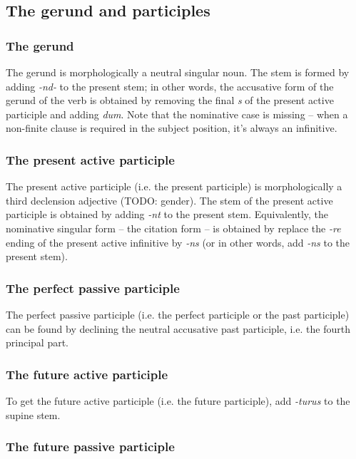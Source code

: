 \documentclass[a4paper, oneside, 12pt]{report}
\newcommand{\form}[1]{\emph{#1}}
\begin{document}
\subsection{The gerund and participles}\label{sec:nominal-form}

\subsubsection{The gerund}\label{sec:gerund-morphology}

The gerund is morphologically a neutral singular noun.
The stem is formed by 
adding \form{-nd-} to the present stem;
in other words, 
the accusative form of the gerund of the verb 
is obtained by removing the final \form{s} 
of the present active participle 
and adding \form{dum}.
Note that the nominative case is missing -- 
when a non-finite clause is required in the subject position,
it's always an infinitive.

\subsubsection{The present active participle}

The present active participle (i.e. the present participle) 
is morphologically a third declension adjective (TODO: gender).
The stem of the present active participle 
is obtained by adding \form{-nt} to the present stem.
Equivalently, the nominative singular form -- the citation form --
is obtained by replace the \form{-re} ending of the present active infinitive by \form{-ns}
(or in other words, add \form{-ns} to the present stem).

\subsubsection{The perfect passive participle}

The perfect passive participle (i.e. the perfect participle or the past participle)
can be found by declining the neutral accusative past participle, 
i.e. the fourth principal part.

\subsubsection{The future active participle}

To get the future active participle (i.e. the future participle), add \form{-turus} to the supine stem.

\subsubsection{The future passive participle}\label{sec:verb-inflection.non-finite.future-passive}
\end{document}
